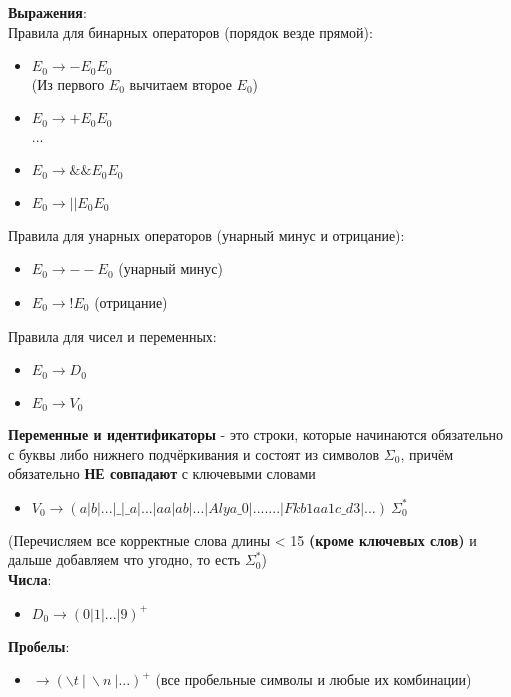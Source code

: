 \documentclass[12pt]{article}
\begin{document}
		
\vspace{\baselineskip}
 
 
 \textbf{Выражения}: \\
 Правила для бинарных операторов (порядок везде прямой): \\
 \begin{itemize}
	\item $E_0 \to - $\textvisiblespace$ E_0 $\textvisiblespace$ E_0 $ \\
	(Из первого $E_0$ вычитаем второе $E_0$) 
	\item $E_0 \to + $\textvisiblespace$ E_0 $\textvisiblespace$ E_0 $ \\
	...
	\item $E_0 \to \&\& $\textvisiblespace$ E_0 $\textvisiblespace$ E_0 $
	\item $E_0 \to || $\textvisiblespace$ E_0 $\textvisiblespace$ E_0 $

\end{itemize}
  
  Правила для унарных операторов (унарный минус и отрицание): \\
  
  \begin{itemize}
 	\item $E_0 \to  - -  $\textvisiblespace$ E_0$ (унарный минус)
 	\item $E_0 \to  !  $\textvisiblespace$ E_0$ (отрицание)
 \end{itemize}
   
   Правила для чисел и переменных: \\
  
  \begin{itemize}
	\item $E_0 \to D_0$
	\item $E_0 \to V_0$
\end{itemize}

\vspace{\baselineskip}
\vspace{\baselineskip}

 \textbf{Переменные и идентификаторы} - это строки, которые начинаются обязательно с буквы либо нижнего подчёркивания и состоят из символов $\Sigma_0$, причём обязательно \textbf{НЕ совпадают} с ключевыми словами  \\
\begin{itemize}
	\item $V_0 \to (a | b | ... |\_ |\_a| ... |aa|ab|...|Alya\_0| .......|Fkb1aa1c\_d3|...)\ \Sigma_0^*$
\end{itemize}
(Перечисляем все корректные слова длины < 15 \textbf{(кроме ключевых слов)} и дальше добавляем что угодно, то есть $\Sigma_0^*$) \\

\textbf{Числа}: 
\begin{itemize}
	\item $D_0 \to (0|1|...|9)^+$
\end{itemize}

\textbf{Пробелы}: \\

    \begin{itemize}
  	\item \textvisiblespace $\to (\backslash t \ | \ \backslash n \ | ...)^+$
  	(все пробельные символы и любые их комбинации)
  \end{itemize}
\end{document}

